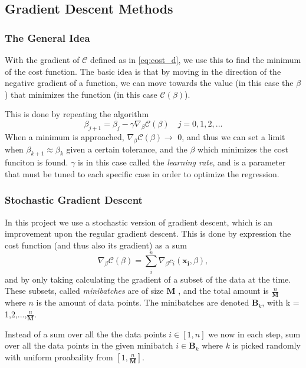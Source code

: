 \subsection{Gradient Descent Methods}
\subsubsection*{The General Idea}
With the gradient of $\mathcal{C}$ defined as in \eqref{eq:cost_d}, we use this to find the minimum of the cost function. The basic idea is that by moving in the direction of the negative gradient of a function, we can move towards the value (in this case the $\beta$) that minimizes the function (in this case $\mathcal{C}(\beta)$). \cite{GDLectures}

This is done by repeating the algorithm
\begin{equation}
    \beta_{j+1} = \beta_j - \gamma \nabla_\beta \mathcal{C}(\beta) \quad j = 0,1,2,...
    \label{eq:gradient_decent}
\end{equation}
When a minimum is approached, $\nabla_\beta \mathcal{C}(\beta) \rightarrow$ 0, and thus we can set a limit when $\beta_{k+1} \approx \beta_k$ given a certain tolerance, and the $\beta$ which minimizes the cost funciton is found. $\gamma$ is in this case called the \textit{learning rate}, and is a parameter that must be tuned to each specific case in order to optimize the regression.

\subsubsection*{Stochastic Gradient Descent}
In this project we use a stochastic version of gradient descent, which is an improvement upon the regular gradient descent. This is done by expression the cost function (and thus also its gradient) as a sum
\begin{equation}
    \nabla_\beta \mathcal{C}(\beta) = \sum_i^n     \nabla_\beta c_i(\boldsymbol{x_i},\beta) ,
    \label{eq:gradient_sum}
\end{equation}
and by only taking calculating the gradient of a subset of the data at the time. These subsets, called \textit{minibatches} are of size $\boldsymbol{M}$ , and the total amount is $\frac{n}{\boldsymbol{M}}$ where $n$ is the amount of data points. The minibatches are denoted $\boldsymbol{B}_k$, with k = 1,2,...,$\frac{n}{\boldsymbol{M}}$.

Instead of a sum over all the the data points $i \in [1,n]$ we now in each step, sum over all the data points in the given minibatch $i \in \boldsymbol{B}_k$ where $k$ is picked randomly with uniform proabaility from $[1, \frac{n}{\boldsymbol{M}}]$.

